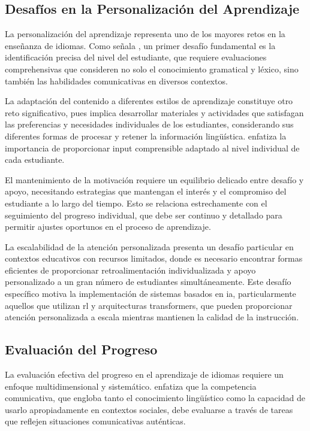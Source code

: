 \subsection{Desafíos en la Personalización del Aprendizaje}

La personalización del aprendizaje representa uno de los mayores retos en la enseñanza de idiomas. Como señala \cite{ellis1994study}, un primer desafío fundamental es la identificación precisa del nivel del estudiante, que requiere evaluaciones comprehensivas que consideren no solo el conocimiento gramatical y léxico, sino también las habilidades comunicativas en diversos contextos.

La adaptación del contenido a diferentes estilos de aprendizaje constituye otro reto significativo, pues implica desarrollar materiales y actividades que satisfagan las preferencias y necesidades individuales de los estudiantes, considerando sus diferentes formas de procesar y retener la información lingüística. \cite{krashen1982principles} enfatiza la importancia de proporcionar input comprensible adaptado al nivel individual de cada estudiante.

El mantenimiento de la motivación requiere un equilibrio delicado entre desafío y apoyo, necesitando estrategias que mantengan el interés y el compromiso del estudiante a lo largo del tiempo. Esto se relaciona estrechamente con el seguimiento del progreso individual, que debe ser continuo y detallado para permitir ajustes oportunos en el proceso de aprendizaje.

La escalabilidad de la atención personalizada presenta un desafío particular en contextos educativos con recursos limitados, donde es necesario encontrar formas eficientes de proporcionar retroalimentación individualizada y apoyo personalizado a un gran número de estudiantes simultáneamente. Este desafío específico motiva la implementación de sistemas basados en \gls{ia}, particularmente aquellos que utilizan \gls{rl} y arquitecturas \gls{transformers}, que pueden proporcionar atención personalizada a escala mientras mantienen la calidad de la instrucción.

\subsection{Evaluación del Progreso}

La evaluación efectiva del progreso en el aprendizaje de idiomas requiere un enfoque multidimensional y sistemático. \cite{ellis1994study} enfatiza que la competencia comunicativa, que engloba tanto el conocimiento lingüístico como la capacidad de usarlo apropiadamente en contextos sociales, debe evaluarse a través de tareas que reflejen situaciones comunicativas auténticas.


